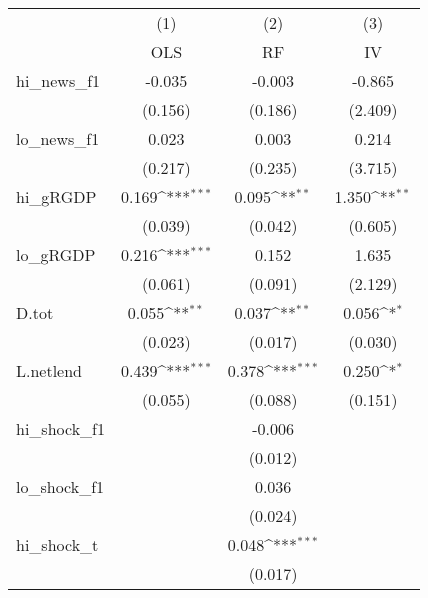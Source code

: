 {
\def\sym#1{\ifmmode^{#1}\else\(^{#1}\)\fi}
\begin{tabular}{l*{3}{c}}
\toprule
            &\multicolumn{1}{c}{(1)}&\multicolumn{1}{c}{(2)}&\multicolumn{1}{c}{(3)}\\
            &\multicolumn{1}{c}{OLS}&\multicolumn{1}{c}{RF}&\multicolumn{1}{c}{IV}\\
\midrule
hi\_news\_f1  &      -0.035         &      -0.003         &      -0.865         \\
            &     (0.156)         &     (0.186)         &     (2.409)         \\
\addlinespace
lo\_news\_f1  &       0.023         &       0.003         &       0.214         \\
            &     (0.217)         &     (0.235)         &     (3.715)         \\
\addlinespace
hi\_gRGDP    &       0.169\sym{***}&       0.095\sym{**} &       1.350\sym{**} \\
            &     (0.039)         &     (0.042)         &     (0.605)         \\
\addlinespace
lo\_gRGDP    &       0.216\sym{***}&       0.152         &       1.635         \\
            &     (0.061)         &     (0.091)         &     (2.129)         \\
\addlinespace
D.tot       &       0.055\sym{**} &       0.037\sym{**} &       0.056\sym{*}  \\
            &     (0.023)         &     (0.017)         &     (0.030)         \\
\addlinespace
L.netlend   &       0.439\sym{***}&       0.378\sym{***}&       0.250\sym{*}  \\
            &     (0.055)         &     (0.088)         &     (0.151)         \\
\addlinespace
hi\_shock\_f1 &                     &      -0.006         &                     \\
            &                     &     (0.012)         &                     \\
\addlinespace
lo\_shock\_f1 &                     &       0.036         &                     \\
            &                     &     (0.024)         &                     \\
\addlinespace
hi\_shock\_t  &                     &       0.048\sym{***}&                     \\
            &                     &     (0.017)         &                     \\

\end{tabular}}
